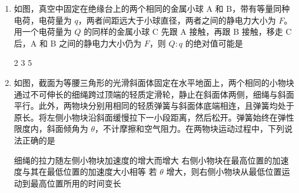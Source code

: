 \documentclass[\gkver]{gaokaozhenti}
\begin{document}
\begin{enumerate}
{引力势能为 $E_{p} = \frac{1}{2}mg_{0}R_{0}$

根据万有引力提供向心力 $\frac{GMm}{(2R_{0})^{2}} = m\frac{v^{2}}{(2R_{0})}$，在该星球表面有 $\frac{GMm}{R_{0}^{2}} = mg_{0}$，解得轨道速度满足 $v^{2} = \frac{g_{0}R_{0}}{2}$，对应动能 $E_{k} = \frac{1}{2}mv^{2} = \frac{1}{4}mg_{0}R_{0}$，总机械能 $E_{\text{总}} = \frac{3}{4}mg_{0}R_{0}$

根据机械能守恒，初始动能 $\frac{1}{2}mv_{0}^{2} = E_{\text{总}}$，解得 $v_{0} = \sqrt{\frac{3g_{0}R_{0}}{2}}$。

故选 B。
}

\item
如图，真空中固定在绝缘台上的两个相同的金属小球 A 和 B，带有等量同种电荷，电荷量为 $q$，两者间距远大于小球直径，两者之间的静电力大小为 $F$。用一个电荷量为 $Q$ 的同样的金属小球 C 先跟 A 接触，再跟 B 接触，移走 C 后，A 和 B 之间的静电力大小仍为 $F$，则 $Q:q$ 的绝对值可能是


{2}
{3}
{5}


\item
如图，截面为等腰三角形的光滑斜面体固定在水平地面上，两个相同的小物块通过不可伸长的细绳跨过顶端的轻质定滑轮，静止在斜面体两侧，细绳与斜面平行。此外，两物块分别用相同的轻质弹簧与斜面体底端相连，且弹簧均处于原长。将左侧小物块沿斜面缓慢拉下一小段距离，然后松开。弹簧始终在弹性限度内，斜面倾角为 $\theta$，不计摩擦和空气阻力。在两物块运动过程中，下列说法正确的是


{细绳的拉力随左侧小物块加速度的增大而增大}
{右侧小物块在最高位置的加速度与其在最低位置的加速度大小相等}
{若 $\theta$ 增大，则右侧小物块从最低位置运动到最高位置所用的时间变长}


\end{enumerate}
\end{document}
